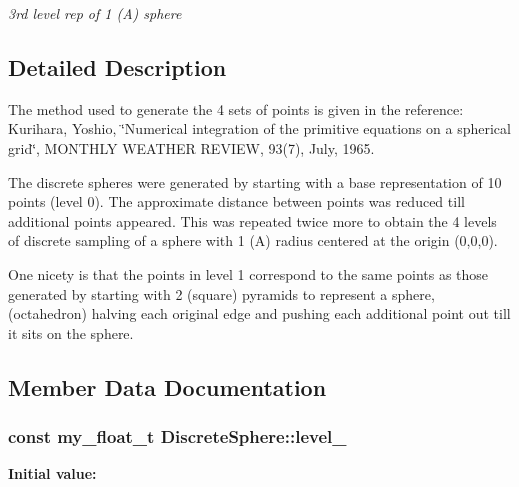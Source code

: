 \begin{CompactItemize}
\begin{CompactList}\small\item\em 3rd level rep of 1 (A) sphere \item\end{CompactList}\end{CompactItemize}


\subsection{Detailed Description}
The method used to generate the 4 sets of points is given in the reference: Kurihara, Yoshio, \char`\"{}Numerical integration of the primitive equations on a spherical grid\char`\"{}, MONTHLY WEATHER REVIEW, 93(7), July, 1965.

The discrete spheres were generated by starting with a base representation of 10 points (level 0). The approximate distance between points was reduced till additional points appeared. This was repeated twice more to obtain the 4 levels of discrete sampling of a sphere with 1 (A) radius centered at the origin (0,0,0).

One nicety is that the points in level 1 correspond to the same points as those generated by starting with 2 (square) pyramids to represent a sphere, (octahedron) halving each original edge and pushing each additional point out till it sits on the sphere. 



\subsection{Member Data Documentation}
\subsubsection{\setlength{\rightskip}{0pt plus 5cm}const my\_\-float\_\-t \bf{Discrete\-Sphere::level\_}\hspace{0.3cm}{\tt  [static, private]}}\label{classASCbase_1_1DiscreteSphere_53fc82a740852de5f8b12e96487c6e90}


\textbf{Initial value:}

